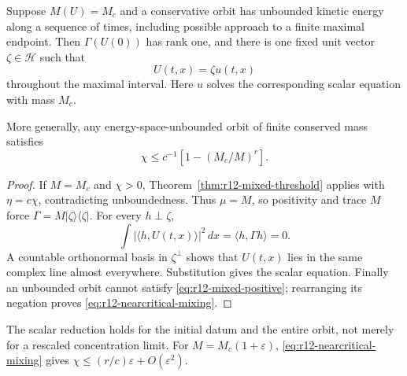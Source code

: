 \begin{corollary}
\label{cor:r12-minimal-scalar}
Suppose $M(U)=M_c$ and a conservative orbit has unbounded kinetic
energy along a sequence of times, including possible approach to a
finite maximal endpoint. Then $\Gamma(U(0))$ has rank one, and there
is one fixed unit vector $\zeta\in\mathcal H$ such that
\[
 U(t,x)=\zeta u(t,x)
\]
throughout the maximal interval. Here $u$ solves the corresponding
scalar equation with mass $M_c$.

More generally, any energy-space-unbounded orbit of finite conserved
mass satisfies
\begin{equation}\label{eq:r12-nearcritical-mixing}
 \chi\le c^{-1}\left[1-(M_c/M)^r\right].
\end{equation}
\end{corollary}
\begin{proof}
If $M=M_c$ and $\chi>0$, Theorem~\ref{thm:r12-mixed-threshold}
applies with $\eta=c\chi$, contradicting unboundedness. Thus
$\mu=M$, so positivity and trace $M$ force
$\Gamma=M|\zeta\rangle\langle\zeta|$. For every
$h\perp\zeta$,
\[
 \int|\langle h,U(t,x)\rangle|^2\,dx
     =\langle h,\Gamma h\rangle=0.
\]
A countable orthonormal basis in $\zeta^\perp$ shows that
$U(t,x)$ lies in the same complex line almost everywhere.
Substitution gives the scalar equation. Finally an unbounded orbit
cannot satisfy \eqref{eq:r12-mixed-positive}; rearranging its
negation proves \eqref{eq:r12-nearcritical-mixing}.
\end{proof}

The scalar reduction holds for the initial datum and the entire
orbit, not merely for a rescaled concentration limit. For
$M=M_c(1+\varepsilon)$, \eqref{eq:r12-nearcritical-mixing} gives
$\chi\le(r/c)\varepsilon+O(\varepsilon^2)$.


